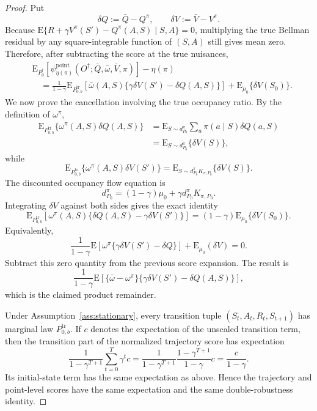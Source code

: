 \documentclass[12pt]{article}
\theoremstyle{remark}\newtheorem{remark}[theorem]{Remark}\theoremstyle{plain}
\newcommand{\E}{\mathrm{E}}
\newcommand{\EstFunPoi}{{\psi}^{\text{point}}}
\begin{document}
\begin{proof}
    Put
    \[
        \delta Q:=\bar Q-Q^\pi,
        \qquad
        \delta V:=\bar V-V^\pi.
    \]
    Because
    $\E\{R+\gamma V^\pi(S')-Q^\pi(A,S)\mid S,A\}=0$,
    multiplying the true Bellman residual by any square-integrable
    function of $(S,A)$ still gives mean zero.  Therefore, after
    subtracting the score at the true nuisances,
    \[
        \begin{aligned}
        &\E_{P_0^\dagger}
        [\EstFunPoi_{\eta(\pi)}
        (O^\dagger;\bar Q,\bar\omega,\bar V,\pi)]
        -\eta(\pi)\\
        &\quad=
        \frac1{1-\gamma}
        \E_{P_{0,b}^{\mathrm{tr}}}\!
        \left[\bar\omega(A,S)
        \{\gamma\delta V(S')-\delta Q(A,S)\}\right]
        +\E_{\mu_0}\{\delta V(S_0)\}.
        \end{aligned}
    \]
    We now prove the cancellation involving the true occupancy ratio.
    By the definition of $\omega^\pi$,
    \[
        \begin{aligned}
        \E_{P_{0,b}^{\mathrm{tr}}}
        \{\omega^\pi(A,S)\delta Q(A,S)\}
        &=
        \E_{S\sim d_{P_0}^\pi}
        \sum_a\pi(a\mid S)\delta Q(a,S)\\
        &=\E_{S\sim d_{P_0}^\pi}\{\delta V(S)\},
        \end{aligned}
    \]
    while
    \[
        \E_{P_{0,b}^{\mathrm{tr}}}
        \{\omega^\pi(A,S)\delta V(S')\}
        =
        \E_{S\sim d_{P_0}^\pi K_{\pi,P_0}}
        \{\delta V(S)\}.
    \]
    The discounted occupancy flow equation is
    \[
        d_{P_0}^\pi
        =(1-\gamma)\mu_0
        +\gamma d_{P_0}^\pi K_{\pi,P_0}.
    \]
    Integrating $\delta V$ against both sides gives the exact
    identity
    \[
        \E_{P_{0,b}^{\mathrm{tr}}}
        \left[
        \omega^\pi(A,S)
        \{\delta Q(A,S)-\gamma\delta V(S')\}\right]
        =(1-\gamma)\E_{\mu_0}\{\delta V(S_0)\}.
    \]
    Equivalently,
    \[
        \frac1{1-\gamma}
        \E\!\left[
        \omega^\pi\{\gamma\delta V(S')-\delta Q\}\right]
        +\E_{\mu_0}(\delta V)=0.
    \]
    Subtract this zero quantity from the previous score expansion.
    The result is
    \[
        \frac1{1-\gamma}
        \E\!\left[
        \{\bar\omega-\omega^\pi\}
        \{\gamma\delta V(S')-\delta Q(A,S)\}\right],
    \]
    which is the claimed product remainder.

    Under Assumption~\ref{ass:stationary}, every transition tuple
    $(S_t,A_t,R_t,S_{t+1})$ has marginal law
    $P_{0,b}^{\mathrm{tr}}$.  If $c$ denotes the expectation of the
    unscaled transition term, then the transition part of the
    normalized trajectory score has expectation
    \[
        \frac1{1-\gamma^{T+1}}
        \sum_{t=0}^T\gamma^t c
        =
        \frac1{1-\gamma^{T+1}}
        \frac{1-\gamma^{T+1}}{1-\gamma}c
        =\frac{c}{1-\gamma}.
    \]
    Its initial-state term has the same expectation as above.
    Hence the trajectory and point-level scores have the same
    expectation and the same double-robustness identity.
\end{proof}
\end{document}
